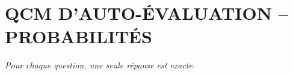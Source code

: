 
\section*{\textcolor{chapcolor}{\MakeUppercase{QCM d'auto-évaluation -- Probabilités}}}

\begin{center}
\textit{Pour chaque question, une seule réponse est exacte.}
\end{center}

